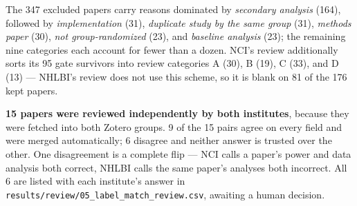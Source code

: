 \documentclass[11pt]{article}
\begin{document}
The 347 excluded papers carry reasons dominated by \emph{secondary analysis} (164), followed by
\emph{implementation} (31), \emph{duplicate study by the same group} (31), \emph{methods paper} (30),
\emph{not group-randomized} (23), and \emph{baseline analysis} (23); the remaining nine categories
each account for fewer than a dozen. NCI's review additionally sorts its 95 gate survivors into
review categories A (30), B (19), C (33), and D (13) --- NHLBI's review does not use this scheme, so
it is blank on 81 of the 176 kept papers.

\textbf{15 papers were reviewed independently by both institutes}, because they were fetched into
both Zotero groups. 9 of the 15 pairs agree on every field and were merged automatically; 6 disagree
and neither answer is trusted over the other. One disagreement is a complete flip --- NCI calls a
paper's power and data analysis both correct, NHLBI calls the same paper's analyses both incorrect.
All 6 are listed with each institute's answer in \texttt{results/review/05\_label\_match\_review.csv},
awaiting a human decision.
\end{document}
